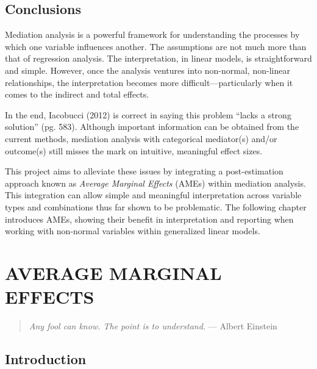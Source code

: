 \documentclass[]{DissertateUSU}
\begin{document}
\section{Conclusions}\label{conclusions}

Mediation analysis is a powerful framework for understanding the
processes by which one variable influences another. The assumptions are
not much more than that of regression analysis. The interpretation, in
linear models, is straightforward and simple. However, once the analysis
ventures into non-normal, non-linear relationships, the interpretation
becomes more difficult---particularly when it comes to the indirect and
total effects.

In the end, Iacobucci (2012) is correct in saying this problem ``lacks a
strong solution'' (pg. 583). Although important information can be
obtained from the current methods, mediation analysis with categorical
mediator(s) and/or outcome(s) still misses the mark on intuitive,
meaningful effect sizes.

This project aims to alleviate these issues by integrating a
post-estimation approach known as \emph{Average Marginal Effects} (AMEs)
within mediation analysis. This integration can allow simple and
meaningful interpretation across variable types and combinations thus
far shown to be problematic. The following chapter introduces AMEs,
showing their benefit in interpretation and reporting when working with
non-normal variables within generalized linear models.

\singlespacing

\FloatBarrier

\newpage

 \fancyhead[R]{\thepage}
\fancyfoot[C]{}

\chapter{AVERAGE MARGINAL EFFECTS}

\begin{quote}
\emph{Any fool can know. The point is to understand.}
--- Albert Einstein
\end{quote}

\doublespacing

\section{Introduction}\label{introduction-2}
\end{document}
